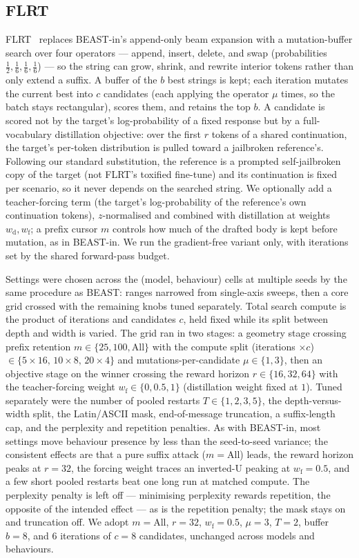 \documentclass{article}
\theoremstyle{plain}
\theoremstyle{definition}
\theoremstyle{remark}
\begin{document}
\subsection{FLRT}
FLRT~\citep{thompson2024flrt} replaces BEAST-in's append-only beam expansion with a mutation-buffer search over four operators --- append, insert, delete, and swap (probabilities $\tfrac12, \tfrac16, \tfrac16, \tfrac16$) --- so the string can grow, shrink, and rewrite interior tokens rather than only extend a suffix. A buffer of the $b$ best strings is kept; each iteration mutates the current best into $c$ candidates (each applying the operator $\mu$ times, so the batch stays rectangular), scores them, and retains the top $b$. A candidate is scored not by the target's log-probability of a fixed response but by a full-vocabulary distillation objective: over the first $r$ tokens of a shared continuation, the target's per-token distribution is pulled toward a jailbroken reference's. Following our standard substitution, the reference is a prompted self-jailbroken copy of the target (not FLRT's toxified fine-tune) and its continuation is fixed per scenario, so it never depends on the searched string. We optionally add a teacher-forcing term (the target's log-probability of the reference's own continuation tokens), $z$-normalised and combined with distillation at weights $w_{\mathrm d}, w_{\mathrm f}$; a prefix cursor $m$ controls how much of the drafted body is kept before mutation, as in BEAST-in. We run the gradient-free variant only, with iterations set by the shared forward-pass budget.

Settings were chosen across the (model, behaviour) cells at multiple seeds by the same procedure as BEAST: ranges narrowed from single-axis sweeps, then a core grid crossed with the remaining knobs tuned separately. Total search compute is the product of iterations and candidates $c$, held fixed while its split between depth and width is varied. The grid ran in two stages: a geometry stage crossing prefix retention $m \in \{25, 100, \text{All}\}$ with the compute split (iterations $\times c$) $\in \{5\times16,\,10\times8,\,20\times4\}$ and mutations-per-candidate $\mu \in \{1, 3\}$, then an objective stage on the winner crossing the reward horizon $r \in \{16, 32, 64\}$ with the teacher-forcing weight $w_{\mathrm f} \in \{0, 0.5, 1\}$ (distillation weight fixed at $1$). Tuned separately were the number of pooled restarts $T \in \{1, 2, 3, 5\}$, the depth-versus-width split, the Latin/ASCII mask, end-of-message truncation, a suffix-length cap, and the perplexity and repetition penalties. As with BEAST-in, most settings move behaviour presence by less than the seed-to-seed variance; the consistent effects are that a pure suffix attack ($m = \text{All}$) leads, the reward horizon peaks at $r = 32$, the forcing weight traces an inverted-U peaking at $w_{\mathrm f} = 0.5$, and a few short pooled restarts beat one long run at matched compute. The perplexity penalty is left off --- minimising perplexity rewards repetition, the opposite of the intended effect --- as is the repetition penalty; the mask stays on and truncation off. We adopt $m = \text{All}$, $r = 32$, $w_{\mathrm f} = 0.5$, $\mu = 3$, $T = 2$, buffer $b = 8$, and $6$ iterations of $c = 8$ candidates, unchanged across models and behaviours.
\end{document}
